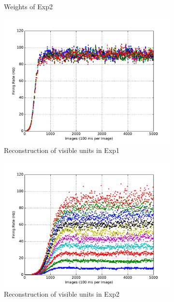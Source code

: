 \begin{figure}
\begin{subfigure}[t]{0.4\textwidth}
		\caption{Weights of Exp2}
	\end{subfigure}
	\begin{subfigure}[t]{0.4\textwidth}
		\includegraphics[width=\textwidth]{pics_sdlm/01_exp_SAE_Orig_long/exp1_recon_s.pdf}
		\caption{Reconstruction of visible units in Exp1}
	\end{subfigure}
	\begin{subfigure}[t]{0.4\textwidth}
		\includegraphics[width=\textwidth]{pics_sdlm/01_exp_SAE_Orig_long/exp2_recon_s.pdf}
		\caption{Reconstruction of visible units in Exp2}
	\end{subfigure}\\
	\begin{subfigure}[t]{0.4\textwidth}

\end{subfigure}
\end{figure}
